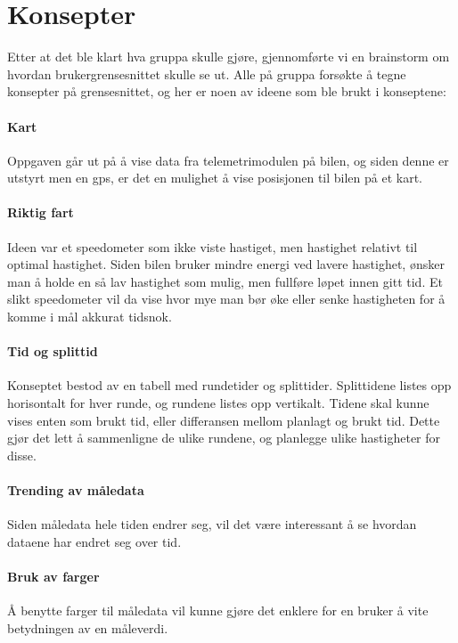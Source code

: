 \section{Konsepter}
Etter at det ble klart hva gruppa skulle gjøre, gjennomførte vi en brainstorm om hvordan brukergrensesnittet skulle se ut.
Alle på gruppa forsøkte å tegne konsepter på grensesnittet, og her er noen av ideene som ble brukt i konseptene:
 

\paragraph{Kart}
Oppgaven går ut på å vise data fra telemetrimodulen på bilen, og siden denne er utstyrt men en gps, er det en mulighet å vise posisjonen til bilen på et kart.

\paragraph{Riktig fart}
Ideen var et speedometer som ikke viste hastiget, men hastighet relativt til optimal hastighet. 
Siden bilen bruker mindre energi ved lavere hastighet, ønsker man å holde en så lav hastighet som mulig, men fullføre løpet innen gitt tid.
Et slikt speedometer vil da vise hvor mye man bør øke eller senke hastigheten for å komme i mål akkurat tidsnok.

\paragraph{Tid og splittid}
Konseptet bestod av en tabell med rundetider og splittider.
Splittidene listes opp horisontalt for hver runde, og rundene listes opp vertikalt.
Tidene skal kunne vises enten som brukt tid, eller differansen mellom planlagt og brukt tid.
Dette gjør det lett å sammenligne de ulike rundene, og planlegge ulike hastigheter for disse.

\paragraph{Trending av måledata}
Siden måledata hele tiden endrer seg, vil det være interessant å se hvordan dataene har endret seg over tid.

\paragraph{Bruk av farger}
Å benytte farger til måledata vil kunne gjøre det enklere for en bruker å vite betydningen av en måleverdi.

